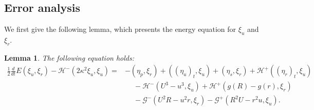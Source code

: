 \documentclass[11pt]{article}
\newcommand{\Hcal} {\mathcal{H}}
\newcommand{\Gcal} {\mathcal{G}}
\newtheorem{lemma}{Lemma}[section]
\numberwithin{equation}{section}
\begin{document}
\subsection{Error analysis}
We first give the following lemma, which presents the energy equation for $\xi_u$ and $\xi_r$.
\begin{lemma} \label{lemma:energy:eq}
The following equation holds:
	\begin{equation}\label{err:energy:eq}
	\begin{split}
		\frac12\frac{d}{dt}E(\xi_u, \xi_r)-\Hcal^-(2\kappa^2\xi_u, \xi_u)\!=\!&-\!(\eta_p, \xi_r)\!+\!((\eta_u)_t,\xi_u)\!+(\eta_s,\xi_r)+\!\Hcal^+((\eta_r)_t, \xi_u)\!\\
		&~\quad-\!\Hcal^-(U^3\!-\!\!u^3, \xi_u)+\Hcal^+(g(R)-g(r),\xi_r)\\
	&~\quad-\Gcal^-(U^2R-u^2r, \xi_r)-\!\Gcal^+(R^2U\!-\!r^2u, \xi_u).
	\end{split}
	\end{equation}
\end{lemma}
\end{document}
